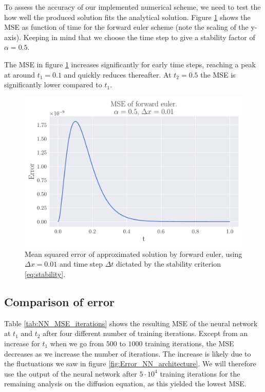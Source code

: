 \documentclass[12pt]{extarticle}
\begin{document}
To assess the accuracy of our implemented numerical scheme, we need to test the how well the produced solution fits the analytical solution. Figure \ref{fig:FE_MSE} shows the MSE as function of time for the forward euler scheme (note the scaling of the y-axis). Keeping in mind that we choose the time step to give a stability factor of $\alpha=0.5$. 

The MSE in figure \ref{fig:FE_MSE} increases significantly for early time steps, reaching a peak at around $t_1=0.1$ and quickly reduces thereafter. At $t_2=0.5$ the MSE is significantly lower compared to $t_1$.  

\begin{figure}[h]
	\centering
	\includegraphics[scale=0.5]{../output/plots/MSE_FE_dx_001.pdf}
	\caption{Mean squared error of approximated solution by forward euler, using $\Delta x=0.01$ and time step $\Delta t$ dictated by the stability criterion \eqref{eq:stability}.}
	\label{fig:FE_MSE}
\end{figure}


\subsection{Comparison of error}
Table \ref{tab:NN_MSE_iterations} shows the resulting MSE of the neural network at $t_1$ and $t_2$ after four different number of training iterations. Except from an increase for $t_1$ when we go from $500$ to $1000$ training iterations, the MSE decreases as we increase the number of iterations. The increase is likely due to the fluctuations we saw in figure \ref{fig:Error_NN_architecture}. We will therefore use the output of the neural network after $5\cdot10^4$ training iterations for the remaining analysis on the diffusion equation, as this yielded the lowest MSE. 
\end{document}
